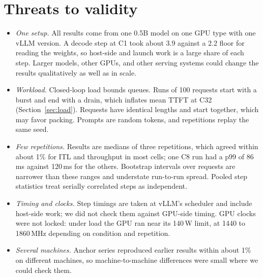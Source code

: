 \section{Threats to validity}
\label{sec:validity}

\begin{itemize}
  \item \emph{One setup.} All results come from one 0.5B model on one GPU type with
    one vLLM version. A decode step at C1 took about 3.9\ms{} against a 2.2\ms{}
    floor for reading the weights, so host-side and launch work is a large share of
    each step. Larger models, other GPUs, and other serving systems could change the
    results qualitatively as well as in scale.
  \item \emph{Workload.} Closed-loop load bounds queues. Runs of 100 requests start
    with a burst and end with a drain, which inflates mean TTFT at C32
    (Section~\ref{sec:load}). Requests have identical lengths and start together, which
    may favor packing. Prompts are random tokens, and repetitions replay the same
    seed.
  \item \emph{Few repetitions.} Results are medians of three repetitions, which agreed
    within about 1\% for ITL and throughput in most cells; one C8 run had a p99 of
    86\,ms against 120\,ms for the others. Bootstrap intervals over requests are
    narrower than these ranges and understate run-to-run spread. Pooled step
    statistics treat serially correlated steps as independent.
  \item \emph{Timing and clocks.} Step timings are taken at vLLM's scheduler and
    include host-side work; we did not check them against GPU-side timing. GPU clocks
    were not locked: under load the GPU ran near its 140\,W limit, at 1440 to
    1860\,MHz depending on condition and repetition.
  \item \emph{Several machines.} Anchor series reproduced earlier results within about
    1\% on different machines, so machine-to-machine differences were small where we
    could check them.
\end{itemize}

